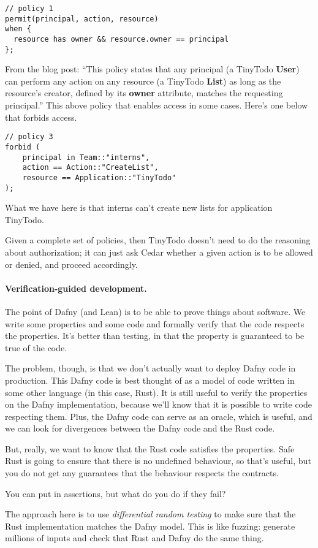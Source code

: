 \documentclass[11pt]{article}
\begin{document}
\begin{verbatim}
// policy 1
permit(principal, action, resource)
when {
  resource has owner && resource.owner == principal
};
\end{verbatim}
From the blog post: ``This policy states that any principal (a TinyTodo \textbf{User}) can perform any action on any resource (a TinyTodo \textbf{List}) as long as the resource’s creator, defined by its \textbf{owner} attribute, matches the requesting principal.'' This above policy that enables access in some cases. Here's one below that forbids access.
\begin{verbatim}
// policy 3
forbid (
	principal in Team::"interns",
	action == Action::"CreateList",
	resource == Application::"TinyTodo"
);
\end{verbatim}
What we have here is that interns can't create new lists for application TinyTodo.

Given a complete set of policies, then TinyTodo doesn't need to do the reasoning about authorization; it can just
ask Cedar whether a given action is to be allowed or denied, and proceed accordingly.

\paragraph{Verification-guided development.} The point of Dafny (and Lean) is to be able to prove
things about software. We write some properties and some code and
formally verify that the code respects the properties.  It's better
than testing, in that the property is guaranteed to be true of the
code.

The problem, though, is that we don't actually want to deploy Dafny
code in production. This Dafny code is best thought of as a model of
code written in some other language (in this case, Rust). It is still
useful to verify the properties on the Dafny implementation, because
we'll know that it is possible to write code respecting them. Plus,
the Dafny code can serve as an oracle, which is useful, and we can
look for divergences between the Dafny code and the Rust code.

But, really, we want to know that the Rust code satisfies the properties.
Safe Rust is going to ensure that there is no undefined behaviour, so that's
useful, but you do not get any guarantees that the behaviour respects the contracts.

You can put in assertions, but what do you do if they fail?

The approach here is to use \emph{differential random testing} to make sure that the
Rust implementation matches the Dafny model. This is like fuzzing: generate millions of inputs
and check that Rust and Dafny do the same thing.
\end{document}
